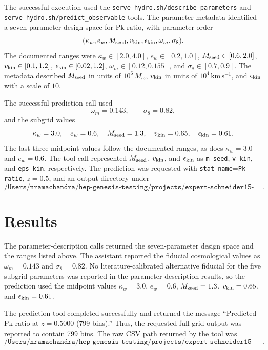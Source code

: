\documentclass[11pt,a4paper]{article}
\begin{document}
The successful execution used the \texttt{serve-hydro.sh/describe\_parameters} and \texttt{serve-hydro.sh/predict\_observable} tools. The parameter metadata identified a seven-parameter design space for \(\mathrm{Pk\mbox{-}ratio}\), with parameter order
\[
(\kappa_w,e_w,M_{\rm seed},v_{\rm kin},\epsilon_{\rm kin},\omega_m,\sigma_8).
\]
The documented ranges were \(\kappa_w\in[2.0,4.0]\), \(e_w\in[0.2,1.0]\), \(M_{\rm seed}\in[0.6,2.0]\), \(v_{\rm kin}\in[0.1,1.2]\), \(\epsilon_{\rm kin}\in[0.02,1.2]\), \(\omega_m\in[0.12,0.155]\), and \(\sigma_8\in[0.7,0.9]\). The metadata described \(M_{\rm seed}\) in units of \(10^6\,M_\odot\), \(v_{\rm kin}\) in units of \(10^4\,\mathrm{km\,s^{-1}}\), and \(\epsilon_{\rm kin}\) with a scale of \(10\).

The successful prediction call used
\[
\omega_m=0.143,\qquad \sigma_8=0.82,
\]
and the subgrid values
\[
\kappa_w=3.0,\quad e_w=0.6,\quad M_{\rm seed}=1.3,\quad
v_{\rm kin}=0.65,\quad \epsilon_{\rm kin}=0.61.
\]
The last three midpoint values follow the documented ranges, as does \(\kappa_w=3.0\) and \(e_w=0.6\). The tool call represented \(M_{\rm seed}\), \(v_{\rm kin}\), and \(\epsilon_{\rm kin}\) as \texttt{m\_seed}, \texttt{v\_kin}, and \texttt{eps\_kin}, respectively. The prediction was requested with \texttt{stat\_name}=\texttt{Pk-ratio}, \(z=0.5\), and an output directory under
\[
\texttt{/Users/nramachandra/hep-genesis-testing/projects/expert-schneider15-cl-bias/runs/261025\_162428}.
\]

\section{Results}

The parameter-description calls returned the seven-parameter design space and the ranges listed above. The assistant reported the fiducial cosmological values as \(\omega_m=0.143\) and \(\sigma_8=0.82\). No literature-calibrated alternative fiducial for the five subgrid parameters was reported in the parameter-description results, so the prediction used the midpoint values \(\kappa_w=3.0\), \(e_w=0.6\), \(M_{\rm seed}=1.3\), \(v_{\rm kin}=0.65\), and \(\epsilon_{\rm kin}=0.61\).

The prediction tool completed successfully and returned the message ``Predicted Pk-ratio at \(z=0.5000\) (799 bins).'' Thus, the requested full-grid output was reported to contain 799 bins. The raw CSV path returned by the tool was
\[
\texttt{/Users/nramachandra/hep-genesis-testing/projects/expert-schneider15-cl-bias/runs/261025\_162428/Pk-ratio\_z0.5000\_prediction.csv}.
\]
\end{document}
